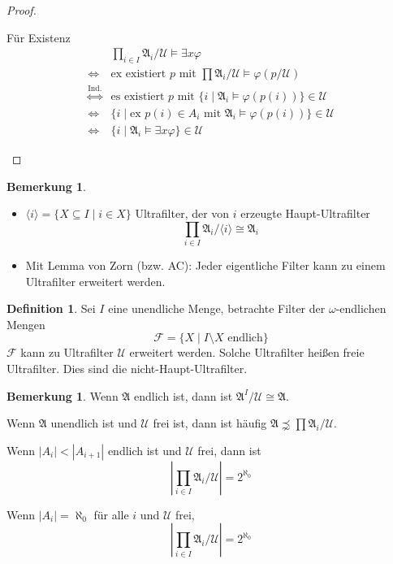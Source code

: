 \documentclass[12pt,parskip=full]{scrartcl}
\newcommand{\abs}[1]{{\left| #1 \right|}}
\theoremstyle{definition}
\newtheorem{definition}[theorem]{Definition}
\newtheorem{remark}[theorem]{Bemerkung}
\begin{document}
\begin{proof}
\begin{itemize}
			Für Existenz
			\begin{align*}
				&\prod_{i \in I} \mathfrak{A}_i / \mathcal{U} \models \exists x \varphi \\
				\Leftrightarrow& \text{ex existiert $p$ mit } \prod \mathfrak{A}_i/\mathcal{U} \models \varphi(p / \mathcal{U}) \\
				\overset{\text{Ind.}}{\Leftrightarrow}& \text{es existiert $p$ mit } \{ i \mid \mathfrak{A}_i \models \varphi(p(i)) \} \in \mathcal{U} \\
				\Leftrightarrow& \{ i \mid \text{ex $p(i) \in A_i$ mit } \mathfrak{A}_i \models \varphi(p(i)) \} \in \mathcal{U} \\
				\Leftrightarrow& \{ i \mid \mathfrak{A}_i \models \exists x \varphi \} \in \mathcal{U}
			\end{align*}
		\end{itemize}
	\end{proof}

	\begin{remark}
		\begin{itemize}
			\item $\langle i \rangle = \{ X \subseteq I \mid i \in X \}$ Ultrafilter, der von $i$ erzeugte Haupt-Ultrafilter
			\begin{equation*}
				\prod_{i \in I} \mathfrak{A}_i/\langle i \rangle \cong \mathfrak{A}_i
			\end{equation*}
			\item Mit Lemma von Zorn (bzw. AC): Jeder eigentliche Filter kann zu einem Ultrafilter erweitert werden.
		\end{itemize}
	\end{remark}

	\begin{definition}
		Sei $I$ eine unendliche Menge, betrachte Filter der $\omega$-endlichen Mengen
		\begin{equation*}
			\mathcal{F} = \{ X \mid I \setminus X \text{ endlich} \}
		\end{equation*}
		$\mathcal{F}$ kann zu Ultrafilter $\mathcal{U}$ erweitert werden. Solche Ultrafilter heißen freie Ultrafilter. Dies sind die nicht-Haupt-Ultrafilter.
	\end{definition}

	\begin{remark}
		Wenn $\mathfrak{A}$ endlich ist, dann ist $\mathfrak{A}^I/\mathcal{U} \cong \mathfrak{A}$.
		
		Wenn $\mathfrak{A}$ unendlich ist und $\mathcal{U}$ frei ist, dann ist häufig $\mathfrak{A} \precnsim \prod \mathfrak{A}_i / \mathcal{U}$.
		
		Wenn $\abs{A_i} < \abs{A_{i+1}}$ endlich ist und $\mathcal{U}$ frei, dann ist
		\begin{equation*}
			\abs{\prod_{i \in I} \mathfrak{A}_i / \mathcal{U}} = 2^{\aleph_0}
		\end{equation*}
		
		Wenn $\abs{A_i} = \aleph_0$ für alle $i$ und $\mathcal{U}$ frei,
		\begin{equation*}
			\abs{\prod_{i \in I} \mathfrak{A}_i / \mathcal{U}} = 2^{\aleph_0}
		\end{equation*}
	\end{remark}
\end{document}
